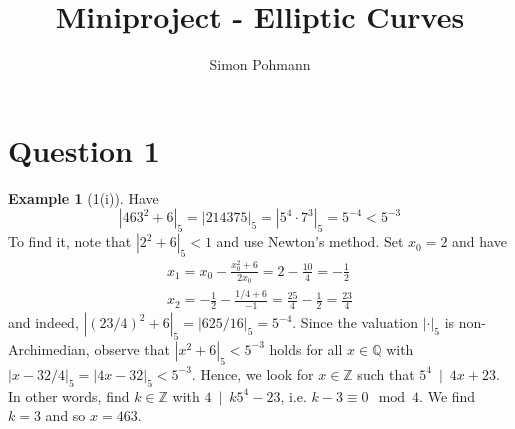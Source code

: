 \documentclass{scrartcl}
\title{Miniproject - Elliptic Curves}
\author{Simon Pohmann}
\newcommand{\Z}{\mathbb{Z}}
\newcommand{\Q}{\mathbb{Q}}
\newcommand{\divides}{\ \mid \ }
\theoremstyle{definition}
\newtheorem{example}[subsection]{Example}
\begin{document}
\maketitle
\listoftheorems

\section{Question 1}

\begin{example}[1(i)]
    Have
    \begin{equation*}
        |463^2 + 6|_5 = |214375|_5 = |5^4 \cdot 7^3|_5 = 5^{-4} < 5^{-3}
    \end{equation*}
    To find it, note that $|2^2 + 6|_5 < 1$ and use Newton's method.
    Set $x_0 = 2$ and have
    \begin{align*}
        x_1 = x_0 - \frac {x_0^2 + 6} {2x_0} = 2 - \frac {10} {4} = -\frac 1 2  \\
        x_2 = -\frac 1 2 - \frac {1/4 + 6} {-1} = \frac {25} 4 - \frac 1 2 = \frac {23} 4
    \end{align*}
    and indeed, $|(23/4)^2 + 6|_5 = |625/16|_5 = 5^{-4}$.
    Since the valuation $|\cdot|_5$ is non-Archimedian, observe that $|x^2 + 6|_5 < 5^{-3}$ holds for all $x \in \Q$ with $|x - 32/4|_5 = |4x - 32|_5 < 5^{-3}$.
    Hence, we look for $x \in \Z$ such that $5^4 \divides 4x + 23$.
    In other words, find $k \in \Z$ with $4 \divides k 5^4 - 23$, i.e. $k - 3 \equiv 0 \mod 4$.
    We find $k = 3$ and so $x = 463$.
\end{example}
\end{document}

